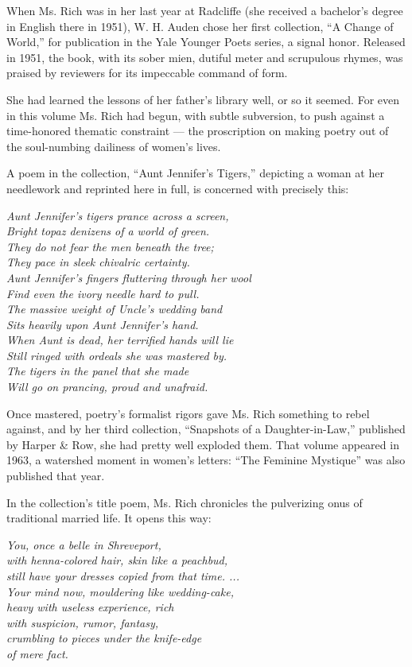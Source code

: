 When Ms. Rich was in her last year at Radcliffe (she received a
bachelor's degree in English there in 1951), W. H. Auden chose her first
collection, ``A Change of World,'' for publication in the Yale Younger
Poets series, a signal honor. Released in 1951, the book, with its sober
mien, dutiful meter and scrupulous rhymes, was praised by reviewers for
its impeccable command of form.

She had learned the lessons of her father's library well, or so it
seemed. For even in this volume Ms. Rich had begun, with subtle
subversion, to push against a time-honored thematic constraint --- the
proscription on making poetry out of the soul-numbing dailiness of
women's lives.

A poem in the collection, ``Aunt Jennifer's Tigers,'' depicting a woman
at her needlework and reprinted here in full, is concerned with
precisely this:

\emph{Aunt Jennifer's tigers prance across a screen,}\\
\emph{Bright topaz denizens of a world of green.}\\
\emph{They do not fear the men beneath the tree;}\\
\emph{They pace in sleek chivalric certainty.}\\
\emph{Aunt Jennifer's fingers fluttering through her wool}\\
\emph{Find even the ivory needle hard to pull.}\\
\emph{The massive weight of Uncle's wedding band}\\
\emph{Sits heavily upon Aunt Jennifer's hand.}\\
\emph{When Aunt is dead, her terrified hands will lie}\\
\emph{Still ringed with ordeals she was mastered by.}\\
\emph{The tigers in the panel that she made}\\
\emph{Will go on prancing, proud and unafraid.}

Once mastered, poetry's formalist rigors gave Ms. Rich something to
rebel against, and by her third collection, ``Snapshots of a
Daughter-in-Law,'' published by Harper \& Row, she had pretty well
exploded them. That volume appeared in 1963, a watershed moment in
women's letters: ``The Feminine Mystique'' was also published that year.

In the collection's title poem, Ms. Rich chronicles the pulverizing onus
of traditional married life. It opens this way:

\emph{You, once a belle in Shreveport,}\\
\emph{with henna-colored hair, skin like a peachbud,}\\
\emph{still have your dresses copied from that time. ...}\\
\emph{Your mind now, mouldering like wedding-cake,}\\
\emph{heavy with useless experience, rich}\\
\emph{with suspicion, rumor, fantasy,}\\
\emph{crumbling to pieces under the knife-edge}\\
\emph{of mere fact.}

